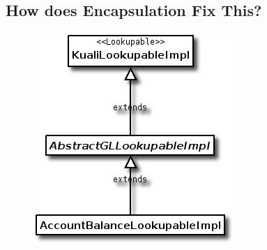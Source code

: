 \documentclass[12pt,notitlepage]{article}
\begin{document}
\begin{s5presentation}
      \W \begin{s5slide}
        \W \section{How does Encapsulation Fix This?}
        \begin{figure}[!h]
          \begin{ifhtml}
          \end{ifhtml}
          \T \includegraphics[bb=75 100 550 400]{Diagrams/InheritanceExample_class.png}
        \end{figure}
      \W \end{s5slide}
      

\end{s5presentation}
\end{document}
